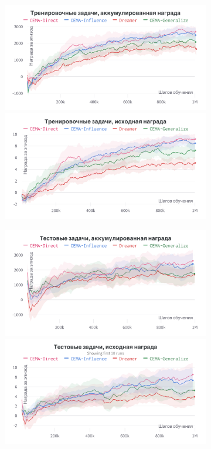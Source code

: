 \begin{figure}[t]
    \centering
    \begin{subfigure}{.47\textwidth}
        \centering
        \includegraphics[width=\linewidth]{figures/cw_cum_train.png}
        \includegraphics[width=\linewidth]{figures/cw_raw_train.png}
    \end{subfigure}
    \begin{subfigure}{.47\textwidth}
        \centering
        \includegraphics[width=\linewidth]{figures/cw_cum_test.png}
        \includegraphics[width=\linewidth]{figures/cw_raw_test.png}

\end{subfigure}
\end{figure}
